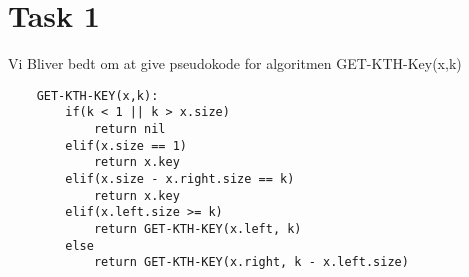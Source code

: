 \section{Task 1}
Vi Bliver bedt om at give pseudokode for algoritmen GET-KTH-Key(x,k)
\begin{lstlisting}
	GET-KTH-KEY(x,k):
		if(k < 1 || k > x.size)
			return nil
		elif(x.size == 1)
			return x.key
		elif(x.size - x.right.size == k)
			return x.key
		elif(x.left.size >= k)
			return GET-KTH-KEY(x.left, k)
		else
			return GET-KTH-KEY(x.right, k - x.left.size)
\end{lstlisting}

